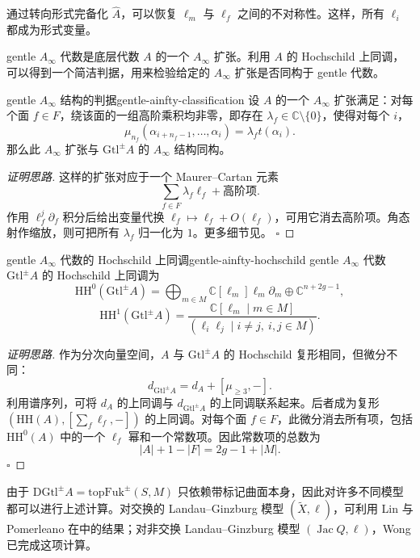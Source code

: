 \begin{note}[形式完备化]
通过转向形式完备化 $\widehat A$，可以恢复 $\ell_m$ 与 $\ell_f$ 之间的不对称性。这样，所有 $\ell_i$ 都成为形式变量。
\end{note}

gentle $A_\infty$ 代数是底层代数 $A$ 的一个 $A_\infty$ 扩张。利用 $A$ 的 Hochschild 上同调，可以得到一个简洁判据，用来检验给定的 $A_\infty$ 扩张是否同构于 gentle 代数。

\begin{theorem}{gentle $A_\infty$ 结构的判据}{gentle-ainfty-classification}
设 $A$ 的一个 $A_\infty$ 扩张满足：对每个面 $f\in F$，绕该面的一组高阶乘积均非零，即存在 $\lambda_f\in\mathbb C\setminus\{0\}$，使得对每个 $i$，
\[
  \mu_{n_f}(\alpha_{i+n_f-1},\ldots,\alpha_i)=\lambda_f t(\alpha_i).
\]
那么此 $A_\infty$ 扩张与 $\mathrm{Gtl}^{\pm}A$ 的 $A_\infty$ 结构同构。
\end{theorem}
\begin{proof}[证明思路]
这样的扩张对应于一个 Maurer--Cartan 元素
\[
  \sum_{f\in F}\lambda_f\ell_f+\text{高阶项}.
\]
作用 $\ell_f^j\partial_f$ 积分后给出变量代换 $\ell_f\mapsto\ell_f+O(\ell_f)$，可用它消去高阶项。角态射作缩放，则可把所有 $\lambda_f$ 归一化为 $1$。更多细节见。
\hfill$\square$
\end{proof}

\begin{theorem}{gentle $A_\infty$ 代数的 Hochschild 上同调}{gentle-ainfty-hochschild}
gentle $A_\infty$ 代数 $\mathrm{Gtl}^{\pm}A$ 的 Hochschild 上同调为
\[
  \mathrm{HH}^{0}(\mathrm{Gtl}^{\pm}A)
  =\bigoplus_{m\in M}\mathbb C[\ell_m]\ell_m\partial_m\oplus\mathbb C^{n+2g-1},
\]
\[
  \mathrm{HH}^{1}(\mathrm{Gtl}^{\pm}A)
  =\frac{\mathbb C[\ell_m\mid m\in M]}
  {(\ell_i\ell_j\mid i\ne j,\ i,j\in M)}.
\]
\end{theorem}
\begin{proof}[证明思路]
作为分次向量空间，$A$ 与 $\mathrm{Gtl}^{\pm}A$ 的 Hochschild 复形相同，但微分不同：
\[
  d_{\mathrm{Gtl}^{\pm}A}=d_A+[\mu_{\geq3},-].
\]
利用谱序列，可将 $d_A$ 的上同调与 $d_{\mathrm{Gtl}^{\pm}A}$ 的上同调联系起来。后者成为复形 $(\mathrm{HH}(A),[\sum_f\ell_f, -])$ 的上同调。对每个面 $f\in F$，此微分消去所有项，包括 $\mathrm{HH}^0(A)$ 中的一个 $\ell_f$ 幂和一个常数项。因此常数项的总数为
\[
  |A|+1-|F|=2g-1+|M|.
\]
\hfill$\square$
\end{proof}

\begin{note}
由于 $\mathrm{DGtl}^{\pm}A=\mathrm{topFuk}^{\pm}(S,M)$ 只依赖带标记曲面本身，因此对许多不同模型都可以进行上述计算。对交换的 Landau--Ginzburg 模型 $(\widetilde X,\ell)$，可利用 Lin 与 Pomerleano 在中的结果；对非交换 Landau--Ginzburg 模型 $(\operatorname{Jac}Q,\ell)$，Wong 已完成这项计算。
\end{note}

